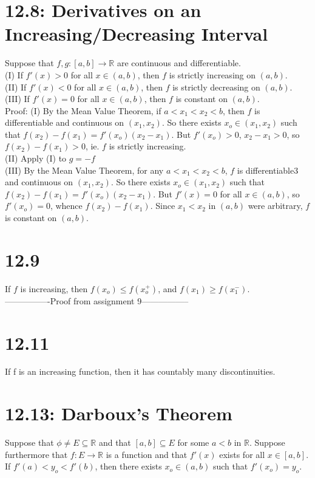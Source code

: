 \documentclass[10pt,letter]{report}
\begin{document}
\section*{12.8: Derivatives on an Increasing/Decreasing Interval}
Suppose that $f,g:[a,b]\rightarrow\mathbb{R}$ are continuous and differentiable. \\ 
(I) If $f'(x)>0$ for all $x\in(a,b)$, then $f$ is strictly increasing on $(a,b)$. \\ 
(II) If $f'(x)<0$ for all $x\in(a,b)$, then $f$ is strictly decreasing on $(a,b)$. \\ 
(III) If $f'(x)=0$ for all $x\in(a,b)$, then $f$ is constant on $(a,b)$. \\ 
Proof: (I) By the Mean Value Theorem, if $a<x_1<x_2<b$, then $f$ is differentiable and continuous on $(x_1,x_2)$. So there exists $x_o\in(x_1,x_2)$ such that $f(x_2)-f(x_1)=f'(x_o)(x_2-x_1)$. But $f'(x_o)>0$, $x_2-x_1>0$, so $f(x_2)-f(x_1)>0$, ie. $f$ is strictly increasing. \\ 
(II) Apply (I) to $g=-f$ \\ 
(III) By the Mean Value Theorem, for any $a<x_1<x_2<b$, $f$ is differentiable3 and continuous on $(x_1,x_2)$. So there exists $x_o\in(x_1,x_2)$ such that $f(x_2)-f(x_1)=f'(x_o)(x_2-x_1)$. But $f'(x)=0$ for all $x\in(a,b)$, so $f'(x_o)=0$, whence $f(x_2)-f(x_1)$. Since $x_1<x_2$ in $(a,b)$ were arbitrary, $f$ is constant on $(a,b)$. 

\section*{12.9}
If $f$ is increasing, then $f(x_o)\leq f(x_o^+)$, and $f(x_1)\geq f(x_1^-)$. \\ 
----------------Proof from assignment 9-----------------

\section*{12.11}
If f is an increasing function, then it has countably many discontinuities.  

\section*{12.13: Darboux's Theorem}
Suppose that $\phi\neq E\subseteq\mathbb{R}$ and that $[a,b]\subseteq E$ for some $a<b$ in $\mathbb{R}$. Suppose furthermore that $f:E\rightarrow\mathbb{R}$ is a function and that $f'(x)$ exists for all $x\in[a,b]$. If $f'(a)<y_o<f'(b)$, then there exists $x_o\in(a,b)$ such that $f'(x_o)=y_o$. 
\end{document}
